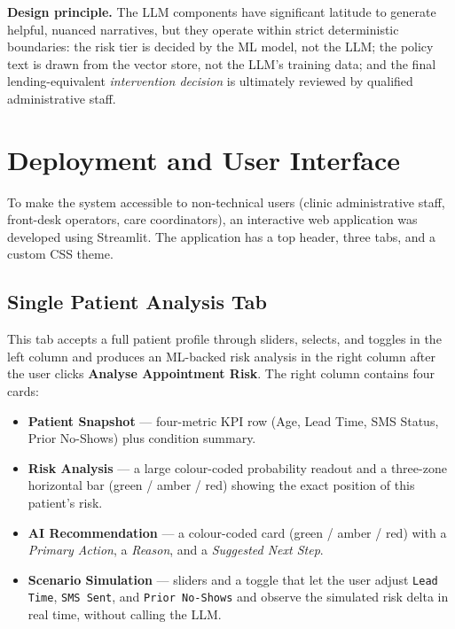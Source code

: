 \documentclass[11pt,a4paper]{article}
\begin{document}
\vspace{6pt}
\colorbox{callout}{\parbox{\dimexpr\textwidth-2\fboxsep}{\small
\textbf{Design principle.} The LLM components have significant latitude to
generate helpful, nuanced narratives, but they operate within strict
deterministic boundaries: the risk tier is decided by the ML model, not the
LLM; the policy text is drawn from the vector store, not the LLM's
training data; and the final lending-equivalent \emph{intervention decision}
is ultimately reviewed by qualified administrative staff.}}

\section{Deployment and User Interface}\label{sec:ui}

To make the system accessible to non-technical users (clinic
administrative staff, front-desk operators, care coordinators), an
interactive web application was developed using Streamlit. The application
has a top header, three tabs, and a custom CSS theme.

\subsection{Single Patient Analysis Tab}

This tab accepts a full patient profile through sliders, selects, and
toggles in the left column and produces an ML-backed risk analysis in the
right column after the user clicks \textbf{Analyse Appointment Risk}. The
right column contains four cards:

\begin{itemize}[leftmargin=1.2em]
\item \textbf{Patient Snapshot} --- four-metric KPI row (Age, Lead Time, SMS
      Status, Prior No-Shows) plus condition summary.
\item \textbf{Risk Analysis} --- a large colour-coded probability readout
      and a three-zone horizontal bar (green / amber / red) showing the
      exact position of this patient's risk.
\item \textbf{AI Recommendation} --- a colour-coded card (green / amber /
      red) with a \emph{Primary Action}, a \emph{Reason}, and a
      \emph{Suggested Next Step}.
\item \textbf{Scenario Simulation} --- sliders and a toggle that let
      the user adjust \texttt{Lead Time}, \texttt{SMS Sent}, and
      \texttt{Prior No-Shows} and observe the simulated risk delta in
      real time, without calling the LLM.
\end{itemize}
\end{document}

